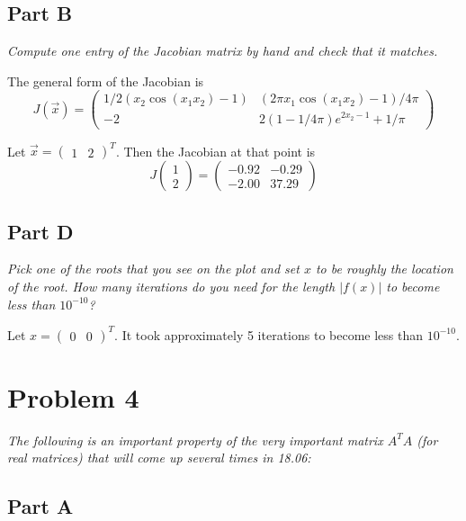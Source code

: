 \documentclass{article}
\begin{document}
\subsection*{Part B}

\textit{Compute one entry of the Jacobian matrix by hand and check that it
matches.}

\bigbreak

The general form of the Jacobian is
$$ J(\vec{x}) = \begin{pmatrix}
    1 / 2 \left( x_2 \cos(x_1 x_2) - 1 \right) & \left(2 \pi x_1 \cos (x_1 x_2) - 1 \right) / 4 \pi \\
    -2 & 2 \left(1 - 1 / 4 \pi \right) e^{2 x_2 - 1} + 1 / \pi
\end{pmatrix} $$

Let $ \vec{x} = \begin{pmatrix} 1 & 2 \end{pmatrix}^T $. Then the Jacobian at that
point is
$$ J \begin{pmatrix}
    1 \\
    2
\end{pmatrix} = \begin{pmatrix} 
    -0.92 & -0.29 \\
    -2.00 & 37.29
\end{pmatrix} $$

\subsection*{Part D}

\textit{Pick one of the roots that you see on the plot and set $ x $ to be
roughly the location of the root. How many iterations do you need for the
length $ \vert f(x) \vert $ to become less than $10^{-10}$?}

\bigbreak

Let $ x = \begin{pmatrix} 0 & 0 \end{pmatrix}^T $. It took approximately 5
iterations to become less than $ 10^{-10} $.

\section*{Problem 4}

\textit{The following is an important property of the very important matrix
$A^T A$ (for real matrices) that will come up several times in 18.06:}

\subsection*{Part A}
\end{document}
